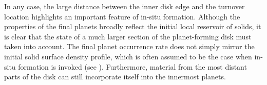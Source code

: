 In any case, the large distance between the inner disk edge and the turnover location highlights an important feature of in-situ formation. Although the properties of the final planets broadly reflect the initial local reservoir of solids, it is clear that the state of a much larger section of the planet-forming disk must taken into account. The final planet occurrence rate does not simply mirror the initial solid surface density profile, which is often assumed to be the case when in-situ formation is invoked (see \cite{chiang13, dai20}). Furthermore, material from the most distant parts of the disk can still incorporate itself into the innermost planets. 
